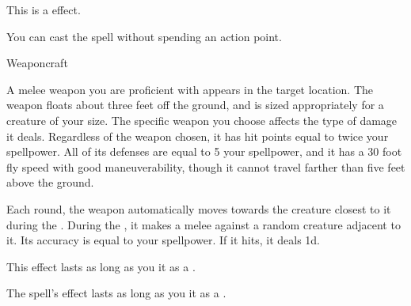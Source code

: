 This is a  effect.


You can cast the spell without spending an action point.




\newpage
\begin{spellsection}{Weaponcraft}

\begin{spellheader}
\end{spellheader}

\begin{spellcontent}

\begin{spelltargetinginfo}




\end{spelltargetinginfo}


\begin{spelleffects}



\spelleffect
A melee weapon you are proficient with appears in the target location.
The weapon floats about three feet off the ground, and is sized appropriately for a creature of your size.
The specific weapon you choose affects the type of damage it deals.
Regardless of the weapon chosen, it has hit points equal to twice your spellpower.
All of its defenses are equal to 5 \add your spellpower, and it has a 30 foot fly speed with good maneuverability, though it cannot travel farther than five feet above the ground.

Each round, the weapon automatically moves towards the creature closest to it during the .
During the , it makes a melee  against a random creature adjacent to it.
Its accuracy is equal to your spellpower.
If it hits, it deals  \minus1d.

This effect lasts as long as you  it as a .








\end{spelleffects}

\end{spellcontent}
\begin{spellfooter}


\end{spellfooter}
\begin{spellsubcontent}


\begin{spellcantrip}
The spell's effect lasts as long as you  it as a .
\end{spellcantrip}


\end{spellsubcontent}
\end{spellsection}


